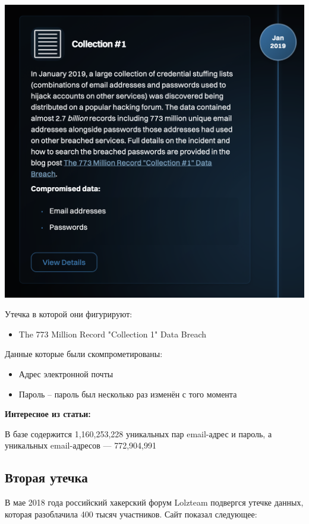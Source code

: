 \documentclass{article}
\begin{document}
\begin{center}
    \includegraphics[width=.9\textwidth]{3}
\end{center}

Утечка в которой они фигурируют:

\begin{itemize}
    \item The 773 Million Record "Collection 1" Data Breach
\end{itemize}

Данные которые были скомпрометированы:

\begin{itemize}
    \item Адрес электронной почты
    \item Пароль -- пароль был несколько раз изменён с того момента
\end{itemize}

\textbf{Интересное из статьи:}

В базе содержится 1,160,253,228 уникальных пар email-адрес и пароль, а уникальных email-адресов — 772,904,991


\subsection{Вторая утечка}
В мае 2018 года российский хакерский форум Lolzteam подвергся утечке данных, которая разоблачила 400 тысяч участников. 
Сайт показал следующее:
\end{document}
